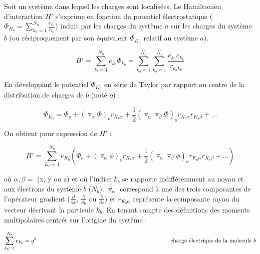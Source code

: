 	Soit un système dans lequel les charges sont localisées. Le Hamiltonien d'interaction $H'$ s'exprime en fonction du potentiel électrostatique ($\Phi_{K_{b}}= \sum_{k_{a}=1}^{N_{a}} \frac{e_{k_{a}}}{r_{k_{a}}}$) induit par les charges du système $a$ sur les charges du système $b$ (ou réciproquement par son équivalent $\Phi_{K_{a}}$ relatif au système $a$).
	
	\begin{equation}
	H' = \sum_{k_{b}=1}^{N_{b}} e_{k_{b}} \Phi_{k_{b}} = \sum_{k_{a}=1}^{N_{a}} \sum_{k_{b}=1}^{N_{b}} \frac{e_{k_{a}} e_{k_{b}}}{r_{k_{a}k_{b}}}
	\end{equation}
	
	En développant le potentiel $\Phi_{K_{b}}$ en série de Taylor par rapport au centre de la distribution de charges de $b$ (noté $o$) :
	
	\begin{equation}
	\Phi_{K_{b}} = \Phi_{o} + (\triangledown_{\alpha} \Phi)_{o} r_{K_{b}\alpha} + \frac{1}{2} (\triangledown_{\alpha} \triangledown_{\beta} \Phi)_{o} r_{K_{b}\alpha} r_{K_{b}\beta} + \ldots
	\end{equation}
	
	On obtient pour expression de $H'$ : 
	
	\begin{equation}
	H' = \sum_{K_{b}=1}^{N_{b}} e_{K_{b}} \left(\Phi_{o} + (\triangledown_{\alpha} \phi)_{o} r_{K_{b}\alpha} + \frac{1}{2}(\triangledown_{\alpha} \triangledown_{\beta}\phi)_{o} r_{K_{b}\alpha} r_{K_{b}\beta} + \ldots \right)
	\end{equation}
	
	\noindent où $\alpha,\beta=$ (x, y ou z) et où l'indice $k_{b}$ se rapporte indifféremment au noyau et aux électrons du système $b$ ($N_{b}$). $\triangledown_{\alpha}$ correspond à une des trois composantes de l'opérateur gradient ($\frac{\partial}{\partial x}$, $\frac{\partial}{\partial y}$ ou $\frac{\partial}{\partial z}$) et $r_{K_{b}\alpha}$ représente la composante rayon du vecteur décrivant la particule $k_{b}$. En tenant compte des définitions des moments multipolaires centrés sur l'origine du système : 
	
	\begin{flushleft}
		\begin{equation*}
		\sum_{k_{b}=1}^{N_{b}} e_{k_{b}} = q^{b} \hspace{8.1cm}\textup{charge électrique de la molecule $b$}     
		\end{equation*}
	\end{flushleft}
	
